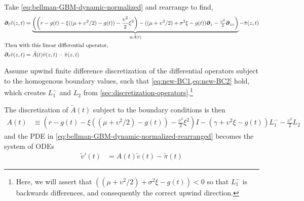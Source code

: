\documentclass[11pt]{article}
\newcommand{\D}[1][]{\ensuremath{\boldsymbol{\partial}_{#1}}}
\newcommand{\R}{\ensuremath{\mathbb{R}}}
\begin{document}
Take \cref{eq:bellman-GBM-dynamic-normalized} and rearrange to find,
\begin{align}
	\D[t]\tilde{v}(z,t) &= \underbrace{\left(\left(r - g(t)- \xi((\mu + \upsilon^2/2)-g(t)) - \frac{\upsilon^2}{2}\xi^2\right) - ((\mu + \upsilon^2/2) + \sigma^2\xi - g(t)) \D[z] - \tfrac{\upsilon^2}{2} \D[zz]\right)}_{\equiv \tilde{A}(t)} - \tilde{\pi}(z,t) \label{eq:bellman-GBM-dynamic-normalized-rearranged}\\
	\intertext{Then with this linear differential operator,}
	\D[t]\tilde{v}(z,t) &= \tilde{A}(t) \tilde{v}(z,t) - \tilde{\pi}(z,t)
\end{align}

Assume upwind finite difference discretization of the differential operators subject to the homogenous boundary values, such that \cref{eq:new-BC1,eq:new-BC2} hold, which creates $L^{-}_1$ and $L_2$ from \cref{sec:discretization-operators}.\footnote{Here, we will assert that $((\mu + \upsilon^2/2) + \sigma^2\xi - g(t)) < 0$ so that $L^{-}_1$ is backwards differences, and consequently the correct upwind direction.}

The discretization of $\tilde{A}(t)$ subject to the boundary conditions is then
\begin{align}
A(t) &\equiv \left(r - g(t)- \xi((\mu + \upsilon^2/2)-g(t)) - \frac{\upsilon^2}{2}\xi^2\right) I - (\gamma + \upsilon^2\xi - g(t)) L^{-}_1 - \tfrac{\upsilon^2}{2} L_2\label{eq:A-def-simple}
\end{align}
and the PDE in \cref{eq:bellman-GBM-dynamic-normalized-rearranged} becomes the system of ODEs
\begin{align}
	\tilde{v}'(t) &= A(t) \tilde{v}(t) - \tilde{\pi}(t)
\end{align}	


\end{document}
